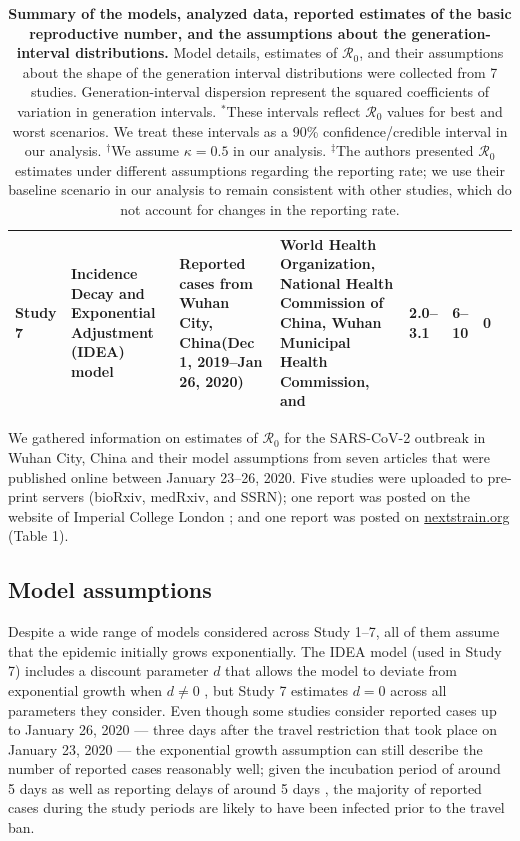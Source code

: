 \documentclass[12pt]{article}
\newcommand{\Ro}{\ensuremath{{\mathcal R}_{0}}\xspace}
\begin{document}
{\begin{landscape}
\begin{table}[!th]
\begin{center}
\begin{tabular}{l|L{2cm}|L{3.2cm}|L{2.8cm}|L{2.5cm}|L{2.4cm}|L{2.7cm}|L{2cm}}
\hline
Study 7 & Incidence Decay and Exponential Adjustment (IDEA) model & Reported cases from Wuhan City, China\newline (Dec 1, 2019--Jan 26, 2020) & World	Health Organization, National Health Commission of China, Wuhan Municipal	Health Commission, and \cite{huang2020clinical} & 2.0--3.1 & 6--10 & 0 & \cite{majumderncov} \\
\hline
\end{tabular}
\end{center}
\caption{
\textbf{Summary of the models, analyzed data, reported estimates of the basic reproductive number, and the assumptions about the generation-interval distributions.}
Model details, estimates of \Ro, and their assumptions about the shape of the generation interval distributions were collected from 7 studies.
Generation-interval dispersion represent the squared coefficients of variation in generation intervals.
$^\ast$These intervals reflect \Ro values for best and worst scenarios. We treat these intervals as a 90\% confidence/credible interval in our analysis.
$^\dagger$We assume $\kappa = 0.5$ in our analysis.
$^\ddagger$The authors presented \Ro estimates under different assumptions regarding the reporting rate; we use their baseline scenario in our analysis to remain consistent with other studies, which do not account for changes in the reporting rate.
}
\end{table}
\end{landscape}
\clearpage
}

We gathered information on estimates of \Ro for the SARS-CoV-2 outbreak in Wuhan City, China and their model assumptions from seven articles that were published online between January 23--26, 2020.
Five studies \citep{liuncov, majumderncov, readncov, riouncov, zhaoncov} were uploaded to pre-print servers (bioRxiv, medRxiv, and SSRN); one report was posted on the website of Imperial College London \citep{imaincov}; and one report was posted on \url{nextstrain.org} \citep{bedfordncov} (Table 1).

\subsection{Model assumptions}

Despite a wide range of models considered across Study 1--7, all of them assume that the epidemic initially grows exponentially.
The IDEA model (used in Study 7) includes a discount parameter $d$ that allows the model to deviate from exponential growth when $d \neq 0$ \citep{fisman2013idea}, but Study 7 estimates $d=0$ across all parameters they consider.
Even though some studies consider reported cases up to January 26, 2020 --- three days after the travel restriction that took place on January 23, 2020 \citep{Tianeabb6105} --- the exponential growth assumption can still describe the number of reported cases reasonably well;
given the incubation period of around 5 days \citep{lauer2020incubation} as well as reporting delays of around 5 days \citep{sun2020early}, the majority of reported cases during the study periods are likely to have been infected prior to the travel ban.
\end{document}
